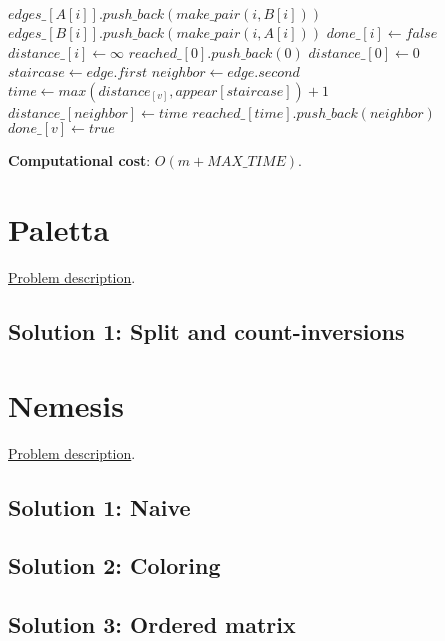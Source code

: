 \documentclass{article}
\begin{document}
\begin{algorithmic}[1]
          \State $edges\_[A[i]].push\_back(make\_pair(i, B[i]))$
          \State $edges\_[B[i]].push\_back(make\_pair(i, A[i]))$
      \EndFor
          \State $done\_[i] \gets false$
          \State $distance\_[i] \gets \infty$
      \EndFor
      \State $reached\_[0].push\_back(0)$
    \State $distance\_[0] \gets 0$
            \State $staircase \gets edge.first$
            \State $neighbor \gets edge.second$
            \State $time \gets max(distance_[v], appear[staircase])+1$
              \State $distance\_[neighbor] \gets time$
              \State $reached\_[time].push\_back(neighbor)$
            \EndIf
          \EndFor
        \State $done\_[v] \gets true$
          \EndIf
      \EndFor
    \EndFor
    \State {}
  \EndFunction
\end{algorithmic}

\begin{framed}
  \noindent
  \textbf{Computational cost}: $O(m + MAX\_TIME)$.
\end{framed}

\section{Paletta}
\href{http://didawiki.cli.di.unipi.it/lib/exe/fetch.php/magistraleinformatica/alg2/algo2_16/paletta.pdf}{Problem description}.
\subsection{Solution 1: Split and count-inversions}

\section{Nemesis}
\href{http://didawiki.cli.di.unipi.it/lib/exe/fetch.php/magistraleinformatica/alg2/algo2_16/nemesi.pdf}{Problem description}.
\subsection{Solution 1: Naive}

\subsection{Solution 2: Coloring}

\subsection{Solution 3: Ordered matrix}
\end{document}
